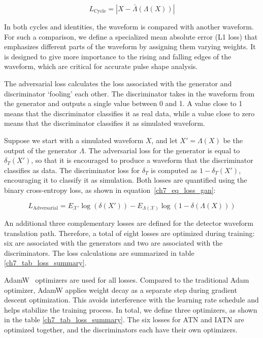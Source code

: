 \begin{equation}\label{eq:loss_cyc}
    L_{\mathrm{Cycle}} = |X - \bar{\Lambda}(\Lambda(X))|
\end{equation}

In both cycles and identities, the waveform is compared with another waveform. For such a comparison, we define a specialized mean absolute error (L1 loss) that emphasizes different parts of the waveform by assigning them varying weights. It is designed to give more importance to the rising and falling edges of the waveform, which are critical for accurate pulse shape analysis.

The adversarial loss calculates the loss associated with the generator and discriminator `fooling' each other. The discriminator takes in the waveform from the generator and outputs a single value between 0 and 1. A value close to 1 means that the discriminator classifies it as real data, while a value close to zero means that the discriminator classifies it as simulated waveform. 

Suppose we start with a simulated waveform $X$, and let $X' = \Lambda(X)$ be the output of the generator $\Lambda$. The adversarial loss for the generator is equal to $\delta_T(X')$, so that it is encouraged to produce a waveform that the discriminator classifies as data. The discriminator loss for $\delta_T$ is computed as $1 - \delta_T(X')$, encouraging it to classify it as simulation. Both losses are quantified using the binary cross-entropy loss, as shown in equation~\ref{ch7_eq_loss_gan}:

\begin{equation}\label{ch7_eq_loss_gan}
    L_{\mathrm{Adversarial}} = E_{\mathcal{X'}}\log(\delta(X')) - E_{\Lambda(\mathcal{X})}\log(1 - \delta(\Lambda(X)))
\end{equation}

An additional three complementary losses are defined for the detector waveform translation path. Therefore, a total of eight losses are optimized during training: six are associated with the generators and two are associated with the discriminators. The loss calculations are summarized in table \ref{ch7_tab_loss_summary}.



AdamW~\cite{adam_w_paper} optimizers are used for all losses. Compared to the traditional Adam optimizer, AdamW applies weight decay as a separate step during gradient descent optimization. This avoids interference with the learning rate schedule and helps stabilize the training process. In total, we define three optimizers, as shown in the table \ref{ch7_tab_loss_summary}. The six losses for ATN and IATN are optimized together, and the discriminators each have their own optimizers.


